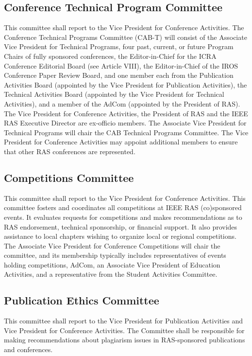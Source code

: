 \documentclass[10pt]{article}
\begin{document}
\subsection{Conference Technical Program Committee}
This committee shall report to the Vice President for Conference Activities. The Conference Technical Programs Committee (CAB-T) will consist of the Associate Vice President for Technical Programs, four past, current, or future Program Chairs of fully sponsored conferences, the Editor-in-Chief for the ICRA Conference Editorial Board (see Article VIII), the Editor-in-Chief of the IROS Conference Paper Review Board, and one member each from the Publication Activities Board (appointed by the Vice President for Publication Activities), the Technical Activities Board (appointed by the Vice President for Technical Activities), and a member of the AdCom (appointed by the President of RAS).  The Vice President for Conference Activities, the President of RAS and the IEEE RAS Executive Director are ex-officio members. The Associate Vice President for Technical Programs will chair the CAB Technical Programs Committee. The Vice President for Conference Activities may appoint additional members to ensure that other RAS conferences are represented.



\subsection{Competitions Committee}
This committee shall report to the Vice President for Conference Activities. This committee fosters and coordinates all competitions at IEEE RAS (co)sponsored events.  It evaluates requests for competitions and makes recommendations as to RAS endorsement, technical sponsorship, or financial support.  It also provides assistance to local chapters wishing to organize local or regional competitions. The Associate Vice President for Conference Competitions will chair the committee, and its membership typically includes representatives of events holding competitions, AdCom, an Associate Vice President of Education Activities, and a representative from the Student Activities Committee.



\subsection{Publication Ethics Committee}

This committee shall report to the Vice President for Publication Activities and Vice President for Conference Activities. The Committee shall be responsible for making recommendations about plagiarism issues in RAS-sponsored publications and conferences.
\end{document}
